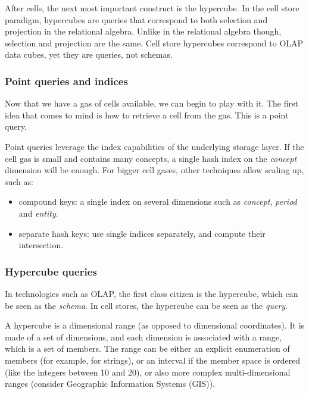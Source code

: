 \documentclass{acm_proc_article-sp}
\begin{document}
After cells, the next most important construct is the hypercube. In the cell store paradigm, hypercubes are queries that correspond to both selection and projection in the relational algebra. Unlike in the relational algebra though, selection and projection are the same. Cell store hypercubes correspond to OLAP data cubes, yet they are queries, not schemas.

\subsubsection{Point queries and indices}

Now that we have a gas of cells available, we can begin to play with it. The first idea that comes to mind is how to retrieve a cell from the gas. This is a point query.

Point queries leverage the index capabilities of the underlying storage layer. If the cell gas is small and contains many concepts, a single hash index on the \emph{concept} dimension will be enough. For bigger cell gases, other techniques allow scaling up, such as:
\vspace{-\topsep}
\begin{itemize}
\item compound keys: a single index on several dimensions such as \emph{concept}, \emph{period} and \emph{entity}.
\item separate hash keys: use single indices separately, and compute their intersection.
\end{itemize}

\subsubsection{Hypercube queries}
In technologies such as OLAP, the first class citizen is the hypercube, which can be seen as the \emph{schema}. In cell stores, the hypercube can be seen as the \emph{query}.

A hypercube is a dimensional range (as opposed to dimensional coordinates). It is made of a set of dimensions, and each dimension is associated with a range, which is a set of members. The range can be either an explicit enumeration of members (for example, for strings), or an interval if the member space is ordered (like the integers between 10 and 20), or also more complex multi-dimensional ranges (consider Geographic Information Systems (GIS)).
\end{document}
